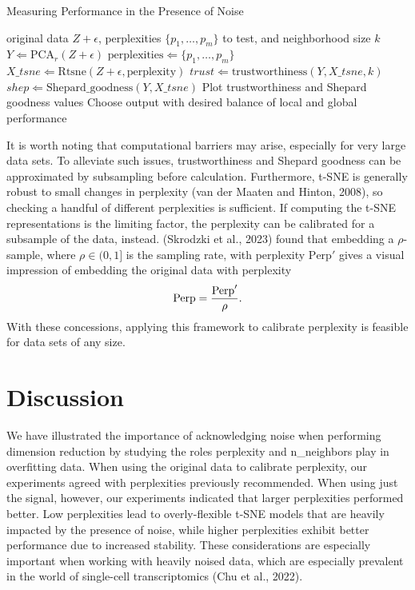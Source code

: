 \documentclass[webpdf,modern,large,namedate]{oup-authoring-template}
\theoremstyle{thmstyleone}%
\theoremstyle{thmstyletwo}%
\theoremstyle{thmstylethree}%
\begin{document}
\begin{algorithm}[h]
\caption{Measuring Performance in the Presence of Noise}\label{algo1}
\begin{algorithmic}[1]
\Require original data $Z + \epsilon$, perplexities $\{p_1, \hdots, p_m\}$ to test, and neighborhood size $k$
\State $Y \Leftarrow \textrm{PCA}_r(Z + \epsilon)$
\State $\textrm{perplexities} \Leftarrow \{p_1, \hdots, p_m\}$
	\Loop
		\State $X\_tsne \Leftarrow \textrm{Rtsne}(Z + \epsilon, \textrm{perplexity})$
		\State $trust \Leftarrow \textrm{trustworthiness}(Y, X\_tsne, k)$
		\State $shep \Leftarrow \textrm{Shepard\_goodness}(Y, X\_tsne)$
	\EndLoop
\EndFor
\State Plot trustworthiness and Shepard goodness values
\State Choose output with desired balance of local and global performance
\end{algorithmic}
\end{algorithm}

It is worth noting that computational barriers may arise, especially for very large data sets. To alleviate such issues, trustworthiness and Shepard goodness can be approximated by subsampling before calculation. Furthermore, t-SNE is generally robust to small changes in perplexity (van der Maaten and Hinton, 2008), so checking a handful of different perplexities is sufficient. If computing the t-SNE representations is the limiting factor, the perplexity can be calibrated for a subsample of the data, instead. (Skrodzki et al., 2023) found that embedding a $\rho$-sample, where $\rho \in (0,1]$ is the sampling rate, with perplexity $\textrm{Perp}'$ gives a visual impression of embedding the original data with perplexity $$\textrm{\textrm{Perp}} = \frac{\textrm{Perp}'}{\rho}.$$ With these concessions, applying this framework to calibrate perplexity is feasible for data sets of any size.

\section{Discussion}
We have illustrated the importance of acknowledging noise when performing dimension reduction by studying the roles perplexity and n\_neighbors play in overfitting data. When using the original data to calibrate perplexity, our experiments agreed with perplexities previously recommended. When using just the signal, however, our experiments indicated that larger perplexities performed better. Low perplexities lead to overly-flexible t-SNE models that are heavily impacted by the presence of noise, while higher perplexities exhibit better performance due to increased stability. These considerations are especially important when working with heavily noised data, which are especially prevalent in the world of single-cell transcriptomics (Chu et al., 2022).
\end{document}
